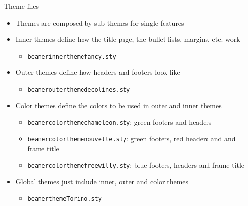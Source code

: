 \begin{frame}[t,fragile]{Theme files}
\begin{itemize}
\item Themes are composed by sub-themes for single features
\item Inner themes define how the title page, the bullet lists, margins,
      etc. work
  \begin{itemize}
    \item \verb!beamerinnerthemefancy.sty!
  \end{itemize}
\item Outer themes define how headers and footers look like
  \begin{itemize}
    \item \verb!beamerouterthemedecolines.sty!
  \end{itemize}
\item Color themes define the colors to be used in outer and inner themes
  \begin{itemize}
    \item \verb!beamercolorthemechameleon.sty!: green footers and headers
    \item \verb!beamercolorthemenouvelle.sty!: green footers, red headers and
          and frame title
    \item \verb!beamercolorthemefreewilly.sty!: blue footers, headers and
          frame title
  \end{itemize}
\item Global themes just include inner, outer and color themes
  \begin{itemize}
    \item \verb!beamerthemeTorino.sty!
  \end{itemize}
\end{itemize}
\end{frame}

